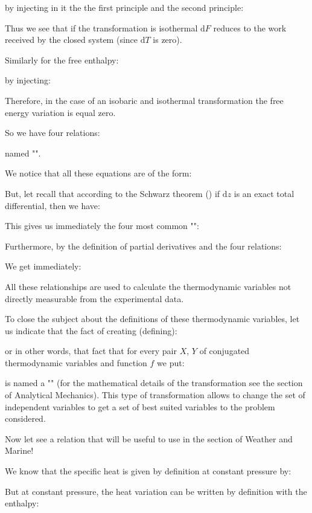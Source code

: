	by injecting in it the the first principle and the second principle:
	
	Thus we see that if the transformation is isothermal $\mathrm{d}F$ reduces to the work received by the closed system (since $\mathrm{d}T$ is zero).

	Similarly for the free enthalpy:
	
	by injecting:
	
	Therefore, in the case of an isobaric and isothermal transformation the free energy variation is equal zero.

	So we have four relations:
	
	named "".
	
	We notice that all these equations are of the form:
	
	But, let recall that according to the Schwarz theorem () if $\mathrm{d}z$ is an exact total differential, then we have:
	
	This gives us immediately the four most common "":
	
	Furthermore, by the definition of partial derivatives and the four relations:
	
	We get immediately:
	
	All these relationships are used to calculate the thermodynamic variables not directly measurable from the experimental data.

	To close the subject about the definitions of these thermodynamic variables, let us indicate that the fact of creating (defining):
	
	or in other words, that fact that for every pair $X$, $Y$ of conjugated thermodynamic variables and function $f$ we put:
	
	is named a "" (for the mathematical details of the transformation see the section of Analytical Mechanics). This type of transformation allows to change the set of independent variables to get a set of best suited variables to the problem considered.

	Now let see a relation that will be useful to use in the section of Weather and Marine!

	We know that the specific heat is given by definition at constant pressure by:
	
	But at constant pressure, the heat variation can be written by definition with the enthalpy:
	
